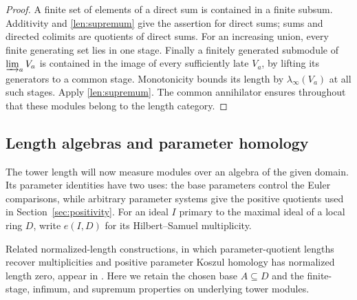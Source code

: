 \begin{proof}
A finite set of elements of a direct sum is contained in a finite
subsum.  Additivity and \eqref{len:supremum} give the assertion for
direct sums; sums and directed colimits are quotients of direct sums.
For an increasing union, every finite generating set lies in one
stage.  Finally a finitely generated submodule of $\varinjlim_a V_a$
is contained in the image of every sufficiently late $V_a$, by lifting
its generators to a common stage.  Monotonicity bounds its length by
$\lambda_\infty(V_a)$ at all such stages.  Apply
\eqref{len:supremum}.  The common annihilator ensures throughout
that these modules belong to the length category.
\end{proof}

\subsection{Length algebras and parameter homology}

The tower length will now measure modules over an algebra of the given
domain.  Its parameter identities have two uses: the base parameters
control the Euler comparisons, while arbitrary parameter systems give
the positive quotients used in Section~\ref{sec:positivity}.
For an ideal $I$ primary to the maximal ideal of a local ring $D$, write
$e(I,D)$ for its Hilbert--Samuel multiplicity.

Related normalized-length constructions, in which parameter-quotient
lengths recover multiplicities and positive parameter Koszul homology has
normalized length zero, appear in \cite[Theorem~3.1]{OpenAILech2026}.
Here we retain the chosen base $A\subseteq D$ and the finite-stage,
infimum, and supremum properties on underlying tower modules.

